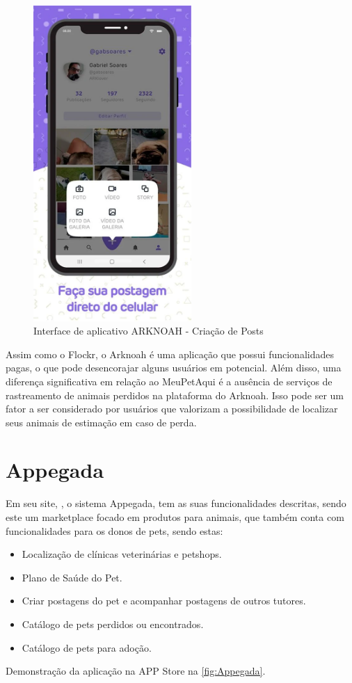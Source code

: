 \begin{figure}[htb]
     \centering
     \includegraphics[width=6cm]{arquivos/Figuras/image23.png}
     \caption{Interface de aplicativo ARKNOAH - Criação de Posts}
     \label{fig:ARKNOAH}
\end{figure}
Assim como o Flockr, o Arknoah é uma aplicação que possui funcionalidades pagas, o que pode desencorajar alguns usuários em potencial. Além disso, uma diferença significativa em relação ao MeuPetAqui é a ausência de serviços de rastreamento de animais perdidos na plataforma do Arknoah. Isso pode ser um fator a ser considerado por usuários que valorizam a possibilidade de localizar seus animais de estimação em caso de perda.

\newpage
\section{Appegada}
Em seu site, , o sistema Appegada, tem as suas funcionalidades descritas, sendo este um marketplace focado em produtos para animais, que também conta com funcionalidades para os donos de pets, sendo estas:
\begin{itemize}
\item Localização de clínicas veterinárias e petshops.
\item Plano de Saúde do Pet.
\item Criar postagens do pet e acompanhar postagens de outros tutores.
\item Catálogo de pets perdidos ou encontrados.
\item Catálogo de pets para adoção.
\end{itemize}
Demonstração da aplicação na APP Store na \ref{fig:Appegada}.

